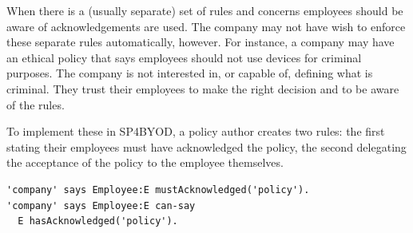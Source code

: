 \documentclass{llncs}
\newcommand{\AppPAL}[0]{SP4BYOD}
\begin{document}
When there is a (usually separate) set of rules and concerns employees should be aware of acknowledgements are used.
The company may not have wish to enforce these separate rules automatically, however.
For instance, a company may have an ethical policy that says employees should not use devices for criminal purposes.
The company is not interested in, or capable of, defining what is criminal.
They trust their employees to make the right decision and to be aware of the rules.

To implement these in \AppPAL, a policy author creates two rules: 
  the first stating their employees must have acknowledged the policy,
  the second delegating the acceptance of the policy to the employee themselves.
\begin{lstlisting}
'company' says Employee:E mustAcknowledged('policy').
'company' says Employee:E can-say
  E hasAcknowledged('policy').
\end{lstlisting}


\end{document}
